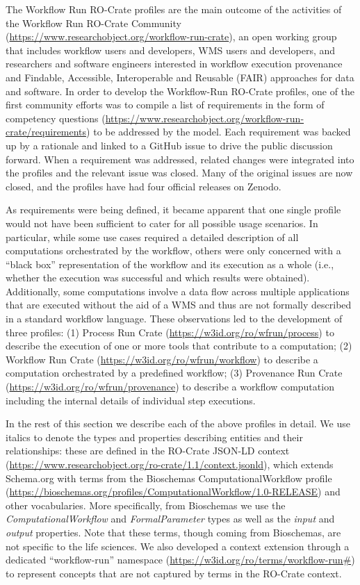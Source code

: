 \documentclass[10pt,letterpaper]{article}
\begin{document}
The Workflow Run RO-Crate profiles are the main outcome of the activities of the Workflow Run RO-Crate Community (\url{https://www.researchobject.org/workflow-run-crate}), an open working group that includes workflow users and developers, WMS users and developers, and researchers and software engineers interested in workflow execution provenance and Findable, Accessible, Interoperable and Reusable (FAIR) approaches for data and software.
In order to develop the Workflow-Run RO-Crate profiles, one of the first community efforts was to compile a list of requirements in the form of competency questions (\url{https://www.researchobject.org/workflow-run-crate/requirements}) to be addressed by the model.
Each requirement was backed up by a rationale and linked to a GitHub issue to drive the public discussion forward. When a requirement was addressed, related changes were integrated into the profiles and the relevant issue was closed. Many of the original issues are now closed, and the profiles have had four official releases on Zenodo.


As requirements were being defined, it became apparent that one single profile would not have been sufficient to cater for all possible usage scenarios.
In particular, while some use cases required a detailed description of all computations orchestrated by the workflow, others were only concerned with a ``black box'' representation of the workflow and its execution as a whole (i.e., whether the execution was successful and which results were obtained).
Additionally, some computations involve a data flow across multiple applications that are executed without the aid of a WMS and thus are not formally described in a standard workflow language.
These observations led to the development of three profiles: 
(1) Process Run Crate (\url{https://w3id.org/ro/wfrun/process})
 to describe the execution of one or more tools that contribute to a computation;
(2) Workflow Run Crate (\url{https://w3id.org/ro/wfrun/workflow})
 to describe a computation orchestrated by a predefined workflow; 
(3) Provenance Run Crate (\url{https://w3id.org/ro/wfrun/provenance})
 to describe a workflow computation including the internal details of individual step executions.

In the rest of this section we describe each of the above profiles in detail.
We use italics to denote the types and properties describing entities and their relationships: these are defined in the RO-Crate JSON-LD context (\url{https://www.researchobject.org/ro-crate/1.1/context.jsonld}), which extends Schema.org with terms from the Bioschemas \cite{Gray 2017} ComputationalWorkflow profile (\url{https://bioschemas.org/profiles/ComputationalWorkflow/1.0-RELEASE}) and other vocabularies. More specifically, from Bioschemas we use the \emph{ComputationalWorkflow} and \emph{FormalParameter} types as well as the \emph{input} and \emph{output} properties. 
Note that these terms, though coming from Bioschemas, are not specific to the life sciences.
We also developed a context extension through a dedicated ``workflow-run'' namespace (\url{https://w3id.org/ro/terms/workflow-run\#}) to represent concepts that are not captured by terms in the RO-Crate context.
\end{document}

